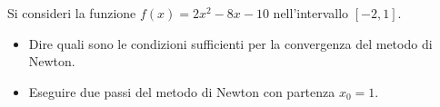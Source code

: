 Si consideri la funzione $f(x)=2x^2-8x-10$ nell'intervallo
$[-2,1]$.

\begin{itemize}
\item Dire quali sono le condizioni sufficienti per la convergenza del metodo di
Newton.
\item Eseguire due passi del metodo di Newton con partenza
$x_0=1$.
\end{itemize}
